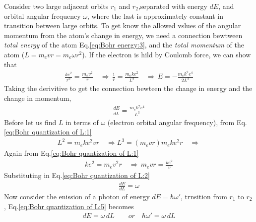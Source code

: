         \bulletpar Consider two large adjacent orbits $r_1$ and $r_2$,separated with energy $dE$, and orbital angular frequency $\omega$, where the last is approximately
        constant in transition between large orbits. To get know the allowed vslues of the angular momentum from the atom's change in energy, we need a connection 
        bewtween \textit{total energy} of the atom Eq.\eqref{eq:Bohr energy:3}, and the \textit{total momentum} of the atom ($L = m_e v r = m_e \omega r^2$). If the 
        electron is hild by Coulomb force, we can show that
        \begin{align}
            \label{eq:Bohr quantization of L:1}
            \frac{k e^2}{r^2} = \frac{m_e v^2}{r} \quad \Rightarrow\, \frac{1}{r} = \frac{m_e k e^2}{L^2}
            \quad \Rightarrow\, E = - \frac{m_e k^2 e^4}{2 L^2}
        \end{align}
        Taking the derivitive to get the connection bewteen the change in energy and the change in momentum,
        \begin{align}
            \label{eq:Bohr quantization of L:2}
            \frac{dE}{dL} = \frac{m_e k^2 e^4}{L^3}
        \end{align}
        Before let us find $L$ in terms of $\omega$ (electron orbital angular frequency), from Eq.\eqref{eq:Bohr quantization of L:1}
        \begin{align}
            \label{eq:Bohr quantization of L:3}
            L^2 = m_e k e^2 v r \quad \Rightarrow L^3 = (m_e v r) m_e k e^2 r \quad 
            \Rightarrow 
        \end{align}
        Again from Eq.\eqref{eq:Bohr quantization of L:1}
        \begin{align}
            \label{eq:Bohr quantization of L:4}
            ke^2 = m_e v^2 r \quad \Rightarrow\, m_e v r = \frac{k e^2}{v}
        \end{align}
        Substituting in Eq.\eqref{eq:Bohr quantization of L:2}
        \begin{align}
            \label{eq:Bohr quantization of L:5}
            \frac{dE}{dL} = \omega
        \end{align}
        Now consider the enission of a photon of energy $dE = \hbar \omega'$, trnsition from $r_1$ to $r_2$, 
        Eq.\eqref{eq:Bohr quantization of L:5} becomes
        \begin{align}
            \label{eq:Bohr quantization of L:6}
            dE = \omega\,  dL \qquad or \quad \hbar \omega' = \omega\, dL
        \end{align}
